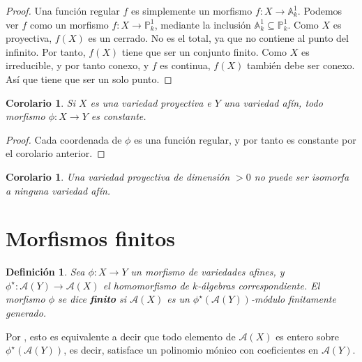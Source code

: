 \documentclass[a4paper,10pt]{book}
\newtheorem{cor}[thm]{Corolario}
\newtheorem{defn}[thm]{Definición}
\newcommand{\AAA}{\mathbb A}
\newcommand{\PP}{\mathbb P}
\newcommand{\calA}{{\mathcal A}}
\begin{document}
\begin{proof}
 Una función regular $f$ es simplemente un morfismo $f:X\to\AAA^1_k$. Podemos ver $f$ como un morfismo $f:X\to\PP^1_k$, mediante la inclusión $\AAA^1_k\subseteq\PP^1_k$. Como $X$ es proyectiva, $f(X)$ es un cerrado. No es el total, ya que no contiene al punto del infinito. Por tanto, $f(X)$ tiene que ser un conjunto finito. Como $X$ es irreducible, y por tanto conexo, y $f$ es continua, $f(X)$ también debe ser conexo. Así que tiene que ser un solo punto.
\end{proof}

\begin{cor}
 Si $X$ es una variedad proyectiva e $Y$ una variedad afín, todo morfismo $\phi:X\to Y$ es constante.
\end{cor}

\begin{proof}
 Cada coordenada de $\phi$ es una función regular, y por tanto es constante por el corolario anterior.
\end{proof}

\begin{cor}\label{proyectivanoafin}
 Una variedad proyectiva de dimensión $>0$ no puede ser isomorfa a ninguna variedad afín.
\end{cor}

\section{Morfismos finitos}

\begin{defn}
 Sea $\phi:X\to Y$ un morfismo de variedades afines, y $\phi^\star:\calA(Y)\to\calA(X)$ el homomorfismo de $k$-álgebras correspondiente. El morfismo $\phi$ se dice {\bf finito} si $\calA(X)$ es un $\phi^\star(\calA(Y))$-módulo finitamente generado.
\end{defn}

Por \cite[Proposición 5.1]{am}, esto es equivalente a decir que todo elemento de $\calA(X)$ es entero sobre $\phi^\star(\calA(Y))$, es decir, satisface un polinomio mónico con coeficientes en $\calA(Y)$.
\end{document}

